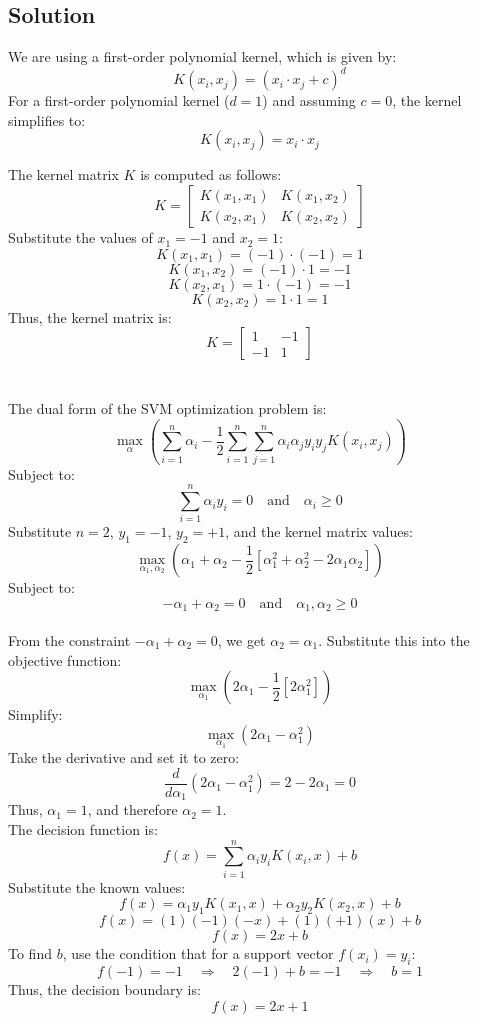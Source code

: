 \documentclass[a4paper, 11pt]{article}
\begin{document}
	\subsection*{Solution}
	We are using a first-order polynomial kernel, which is given by:
	\[
	K(x_i, x_j) = (x_i \cdot x_j + c)^d
	\]
	For a first-order polynomial kernel ($d=1$) and assuming $c=0$, the kernel simplifies to:
	\[
	K(x_i, x_j) = x_i \cdot x_j
	\]
	

	\noindent The kernel matrix $K$ is computed as follows:
	\[
	K = 
	\begin{bmatrix}
		K(x_1, x_1) & K(x_1, x_2) \\
		K(x_2, x_1) & K(x_2, x_2)
	\end{bmatrix}
	\]
	Substitute the values of $x_1 = -1$ and $x_2 = 1$:
	\[
	K(x_1, x_1) = (-1) \cdot (-1) = 1
	\]
	\[
	K(x_1, x_2) = (-1) \cdot 1 = -1
	\]
	\[
	K(x_2, x_1) = 1 \cdot (-1) = -1
	\]
	\[
	K(x_2, x_2) = 1 \cdot 1 = 1
	\]
	Thus, the kernel matrix is:
	\[
	K = 
	\begin{bmatrix}
		1 & -1 \\
		-1 & 1
	\end{bmatrix}
	\]\\\\
	The dual form of the SVM optimization problem is:
	\[
	\max_{\alpha} \left( \sum_{i=1}^{n} \alpha_i - \frac{1}{2} \sum_{i=1}^{n} \sum_{j=1}^{n} \alpha_i \alpha_j y_i y_j K(x_i, x_j) \right)
	\]
	Subject to:
	\[
	\sum_{i=1}^{n} \alpha_i y_i = 0 \quad \text{and} \quad \alpha_i \geq 0
	\]
	Substitute $n=2$, $y_1 = -1$, $y_2 = +1$, and the kernel matrix values:
	\[
	\max_{\alpha_1, \alpha_2} \left( \alpha_1 + \alpha_2 - \frac{1}{2} \left[ \alpha_1^2 + \alpha_2^2 - 2\alpha_1 \alpha_2 \right] \right)
	\]
	Subject to:
	\[
	-\alpha_1 + \alpha_2 = 0 \quad \text{and} \quad \alpha_1, \alpha_2 \geq 0
	\]
	\\
	From the constraint $-\alpha_1 + \alpha_2 = 0$, we get $\alpha_2 = \alpha_1$. Substitute this into the objective function:
	\[
	\max_{\alpha_1} \left( 2\alpha_1 - \frac{1}{2} \left[ 2\alpha_1^2 \right] \right)
	\]
	Simplify:
	\[
	\max_{\alpha_1} \left( 2\alpha_1 - \alpha_1^2 \right)
	\]
	Take the derivative and set it to zero:
	\[
	\frac{d}{d\alpha_1} \left( 2\alpha_1 - \alpha_1^2 \right) = 2 - 2\alpha_1 = 0
	\]
	Thus, $\alpha_1 = 1$, and therefore $\alpha_2 = 1$.
	\\

	\noindent The decision function is:
	\[
	f(x) = \sum_{i=1}^{n} \alpha_i y_i K(x_i, x) + b
	\]
	Substitute the known values:
	\[
	f(x) = \alpha_1 y_1 K(x_1, x) + \alpha_2 y_2 K(x_2, x) + b
	\]
	\[
	f(x) = (1)(-1)(-x) + (1)(+1)(x) + b
	\]
	\[
	f(x) = 2x + b
	\]
	To find $b$, use the condition that for a support vector $f(x_i) = y_i$:
	\[
	f(-1) = -1 \quad \Rightarrow \quad 2(-1) + b = -1 \quad \Rightarrow \quad b = 1
	\]
	Thus, the decision boundary is:
	\[
	f(x) = 2x + 1
	\]
	
\end{document}
